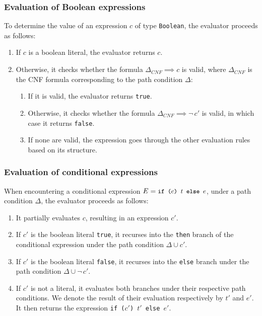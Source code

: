 \documentclass[a4paper,twoside]{article}
\newcommand{\InlineS}[1]{\lstinline[language=PureScala,basicstyle=\small\ttfamily,columns=fixed]|#1|}
\newcommand{\stt}[1]{\texttt{\small{#1}}}
\begin{document}
\subsubsection*{Evaluation of Boolean expressions}

To determine the value of an expression $c$ of type \stt{Boolean}, the evaluator proceeds as follows:

\begin{enumerate}
\item If $c$ is a boolean literal, the evaluator returns $c$.
\item Otherwise, it checks whether the  formula $\Delta_{CNF} \implies c$ is valid, where $\Delta_{CNF}$ is the CNF formula corresponding to the path condition $\Delta$:
\begin{enumerate}
\item If it is valid, the evaluator returns \InlineS{true}.
\item Otherwise, it checks whether the formula $\Delta_{CNF} \implies \neg\,c'$ is valid, in which case it returns \InlineS{false}.
\item If none are valid, the expression goes through the other evaluation rules based on its structure.
\end{enumerate}
\end{enumerate}

\subsubsection*{Evaluation of conditional expressions}

When encountering a conditional expression $E = \stt{if ($c$) $t$ else $e$}$, under a path condition $\Delta$, the evaluator proceeds as follows:

\begin{enumerate}
\item It partially evaluates $c$, resulting in an expression $c'$.
\item If $c'$ is the boolean literal \InlineS{true}, it recurses into the \stt{then} branch of the conditional expression under the path condition $\Delta \cup c'$.
\item If $c'$ is the boolean literal \InlineS{false}, it recurses into the 
\stt{else} branch under the path condition $\Delta \cup \neg\,c'$.
\item If $c'$ is not a literal, it evaluates both branches under their respective path conditions. We denote the result of their evaluation respectively by $t'$ and $e'$. It then returns the expression \stt{if ($c'$) $t'$ else $e'$}.
\end{enumerate}
\end{document}
